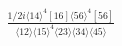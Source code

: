 \documentclass[varwidth, border=5pt]{standalone}
\begin{document}
\begin{my}
$\begin{gathered}
\scriptscriptstyle\frac{1/2i\langle14\rangle^4[16]\langle56\rangle^4[56]}{\langle12\rangle\langle15\rangle^4\langle23\rangle\langle34\rangle\langle45\rangle}
\end{gathered}$
\end{my}
\end{document}
